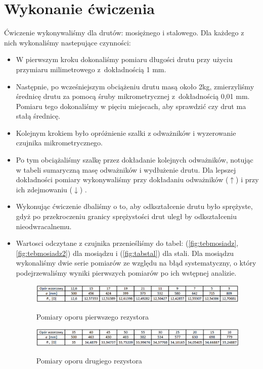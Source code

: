 \documentclass [a4paper,11pt]{article}
\begin{document}
	\section{Wykonanie ćwiczenia}
	Ćwiczenie wykonywaliśmy dla drutów: mosiężnego i stalowego. Dla każdego z nich wykonaliśmy nastepujące czynności:
	\begin{itemize}
		\item W pierwszym kroku dokonaliśmy pomiaru długości drutu przy użyciu przymiaru milimetrowego z~dokładnością 1 mm.
		
		\item Następnie, po wcześniejszym obciążeniu drutu masą około 2kg, zmierzyliśmy średnicę drutu za pomocą śruby mikrometrycznej z~dokładnością 0,01 mm. Pomiaru tego dokonaliśmy w pięciu miejscach, aby sprawdzić czy drut ma stałą średnicę.
		
		\item Kolejnym krokiem było opróżnienie szalki z odważników i wyzerowanie czujnika mikrometrycznego.
		
		\item Po tym obciążaliśmy szalkę przez dokładanie kolejnych odważników, notując w tabeli sumaryczną masę odważników i wydłużenie drutu. Dla lepszej dokładności pomiary wykonywaliśmy przy dokładaniu odważników ($\uparrow $) i przy ich zdejmowaniu ($\downarrow $) .
		
		\item Wykonując ćwiczenie dbaliśmy o to, aby odkształcenie drutu było sprężyste, gdyż po przekroczeniu granicy sprężystości drut uległ by odkształceniu nieodwracalnemu.
		
		\item Wartosci odczytane z czujnika przenieśliśmy do tabel: (\ref{fig:tebmosiadz}, \ref{fig:tebmosiadz2}) dla mosiądzu i (\ref{fig:tabstal}) dla stali. Dla mosiądzu wykonaliśmy dwie serie pomiarów ze względu na błąd systematyczny, o który podejrzewaliśmy wyniki pierwszych pomiarów po ich wstępnej analizie.
	\renewcommand*{\figurename}{Tabela} 
	\setcounter{figure}{0}
	
	\begin{figure}[!h]
		\centering
		\caption{Pomiary oporu pierwszego rezystora}
			\includegraphics[width=\textwidth]{R1}
		\label{fig:r1}
	\end{figure}
	
	\begin{figure}[!h]
		\centering
		\caption{Pomiary oporu drugiego rezystora}
			\includegraphics[width=\textwidth]{R2}
		\label{fig:r2}
	\end{figure}
	

\end{itemize}
\end{document}
